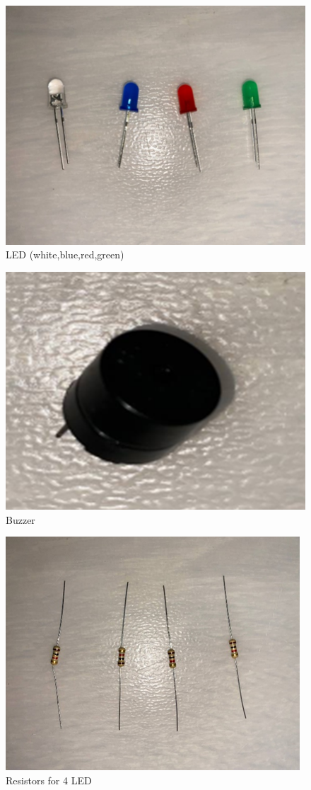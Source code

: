 \begin{figure}[htbp]
\centerline{\includegraphics{image1.png}}
\caption{LED (white,blue,red,green)}
\label{fig}
\end{figure}

\begin{figure}[htbp]
\centerline{\includegraphics{image2.png}}
\caption{Buzzer}
\label{fig}
\end{figure}

\begin{figure}[htbp]
\centerline{\includegraphics{image3.png}}
\caption{Resistors for 4 LED}
\label{fig}
\end{figure}

